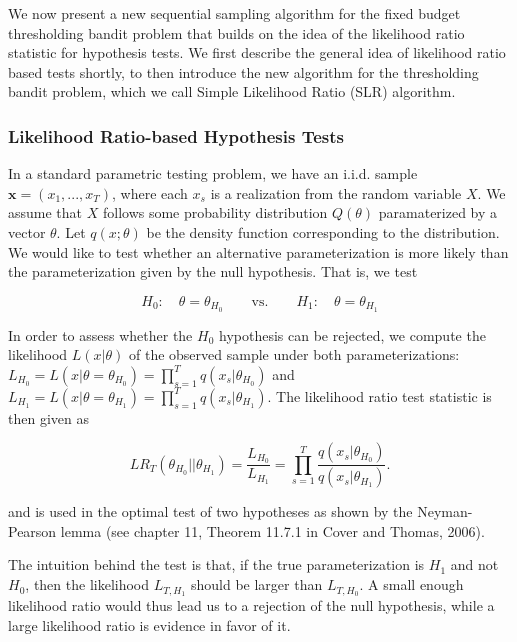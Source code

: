 \documentclass[11pt,]{article}
\begin{document}
We now present a new sequential sampling algorithm for the fixed budget
thresholding bandit problem that builds on the idea of the likelihood
ratio statistic for hypothesis tests. We first describe the general idea
of likelihood ratio based tests shortly, to then introduce the new
algorithm for the thresholding bandit problem, which we call Simple
Likelihood Ratio (SLR) algorithm.

\subsubsection{\texorpdfstring{Likelihood Ratio-based Hypothesis Tests
\label{sec:LRTests}}{Likelihood Ratio-based Hypothesis Tests }}\label{likelihood-ratio-based-hypothesis-tests}

In a standard parametric testing problem, we have an i.i.d. sample
\(\bm{x} = (x_1, ..., x_T)\), where each \(x_s\) is a realization from
the random variable \(X\). We assume that \(X\) follows some probability
distribution \(Q(\theta)\) paramaterized by a vector \(\theta\). Let
\(q(x;\theta)\) be the density function corresponding to the
distribution. We would like to test whether an alternative
parameterization is more likely than the parameterization given by the
null hypothesis. That is, we test

\[
H_0: \quad \theta = \theta_{H_0} \qquad \text{vs.} \qquad H_1: \quad \theta = \theta_{H_1}
\]

In order to assess whether the \(H_0\) hypothesis can be rejected, we
compute the likelihood \(L(x|\theta)\) of the observed sample under both
parameterizations:
\(L_{H_0} = L(x|\theta = \theta_{H_0}) = \prod_{s=1}^T q(x_s|\theta_{H_0})\)
and
\(L_{H_1} = L(x|\theta = \theta_{H_1}) = \prod_{s=1}^T q(x_s|\theta_{H_1})\).
The likelihood ratio test statistic is then given as

\[
LR_T(\theta_{H_0}|| \theta_{H_1}) = \frac{L_{H_0}}{L_{H_1}} = \prod_{s=1}^T\frac{q(x_s|\theta_{H_0})}{ q(x_s|\theta_{H_1})}.
\]

and is used in the optimal test of two hypotheses as shown by the
Neyman-Pearson lemma (see chapter 11, Theorem 11.7.1 in Cover and
Thomas, 2006).

The intuition behind the test is that, if the true parameterization is
\(H_1\) and not \(H_0\), then the likelihood \(L_{T,H_1}\) should be
larger than \(L_{T,H_0}\). A small enough likelihood ratio would thus
lead us to a rejection of the null hypothesis, while a large likelihood
ratio is evidence in favor of it.
\end{document}

